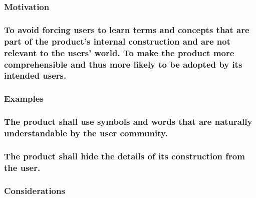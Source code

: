\documentclass[
]{article}
\begin{document}
\hypertarget{motivation-34}{%
\subsubsection{Motivation}\label{motivation-34}}

\hypertarget{to-avoid-forcing-users-to-learn-terms-and-concepts-that-are-part-of-the-products-internal-construction-and-are-not-relevant-to-the-users-world.-to-make-the-product-more-comprehensible-and-thus-more-likely-to-be-adopted-by-its-intended-users.}{%
\subsubsection{To avoid forcing users to learn terms and concepts that
are part of the product's internal construction and are not relevant to
the users' world. To make the product more comprehensible and thus more
likely to be adopted by its intended
users.}\label{to-avoid-forcing-users-to-learn-terms-and-concepts-that-are-part-of-the-products-internal-construction-and-are-not-relevant-to-the-users-world.-to-make-the-product-more-comprehensible-and-thus-more-likely-to-be-adopted-by-its-intended-users.}}

\hypertarget{examples-19}{%
\subsubsection{Examples}\label{examples-19}}

\hypertarget{the-product-shall-use-symbols-and-words-that-are-naturally-understandable-by-the-user-community.}{%
\subsubsection{The product shall use symbols and words that are
naturally understandable by the user
community.}\label{the-product-shall-use-symbols-and-words-that-are-naturally-understandable-by-the-user-community.}}

\hypertarget{the-product-shall-hide-the-details-of-its-construction-from-the-user.}{%
\subsubsection{The product shall hide the details of its construction
from the
user.}\label{the-product-shall-hide-the-details-of-its-construction-from-the-user.}}

\hypertarget{considerations-23}{%
\subsubsection{Considerations}\label{considerations-23}}
\end{document}
